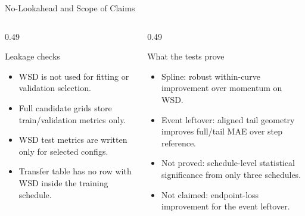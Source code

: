 \documentclass[fontset=fandol,aspectratio=169,10pt]{ctexbeamer}
\begin{document}
\begin{frame}{No-Lookahead and Scope of Claims}
  \begin{columns}[T,onlytextwidth]
    \begin{column}{0.49\textwidth}
      \begin{block}{Leakage checks}
        \begin{itemize}
          \item WSD is not used for fitting or validation selection.
          \item Full candidate grids store train/validation metrics only.
          \item WSD test metrics are written only for selected configs.
          \item Transfer table has no row with WSD inside the training schedule.
        \end{itemize}
      \end{block}
    \end{column}
    \begin{column}{0.49\textwidth}
      \begin{block}{What the tests prove}
        \begin{itemize}
          \item Spline: robust within-curve improvement over momentum on WSD.
          \item Event leftover: aligned tail geometry improves full/tail MAE over step reference.
          \item Not proved: schedule-level statistical significance from only three schedules.
          \item Not claimed: endpoint-loss improvement for the event leftover.
        \end{itemize}
      \end{block}
    \end{column}
  \end{columns}
\end{frame}
\end{document}
